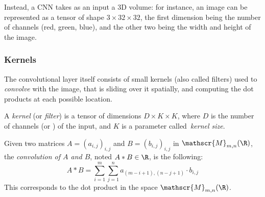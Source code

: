 Instead, a CNN takes as an input a 3D volume: for instance, an image can be represented as a tensor of shape $3\times32\times32$, the first dimension being the number of channels (red, green, blue), and the other two being the width and height of the image.

\subsubsection{Kernels}
The convolutional layer itself consists of small kernels (also called filters) used to \emph{convolve} with the image, that is sliding over it spatially, and computing the dot products at each possible location.
\begin{definition}[Kernel]
    A \emph{kernel} (or \emph{filter}) is a tensor of dimensions $D\times K\times K$, where $D$ is the number of channels (or ) of the input, and $K$ is a parameter called \emph{kernel size}.
\end{definition}

\begin{definition}
    Given two matrices $A=(a_{i, j})_{i, j}$ and $B=(b_{i, j})_{i, j}$ in $\mathscr{M}_{m, n}(\R)$, the \emph{convolution of $A$ and $B$}, noted $A*B\in\R$, is the following:
    \begin{equation}
        A*B = \sum_{i=1}^m \sum_{j=1}^n a_{(m-i+1), (n-j+1)} \cdot b_{i, j}
    \end{equation}
    This corresponds to the dot product in the space $\mathscr{M}_{m, n}(\R)$.
\end{definition}

